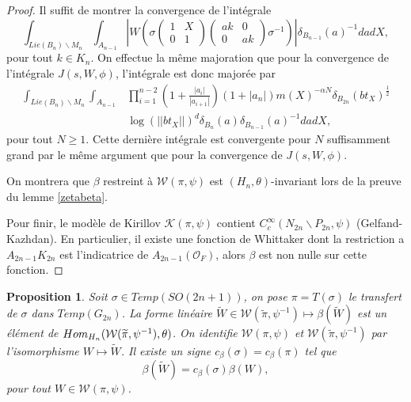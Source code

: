 \documentclass{amsart}
\newtheorem{proposition}{Proposition}[section]
\DeclareMathOperator{\Hom}{\mathnormal{Hom}}
\begin{document}
\begin{proof}
Il suffit de montrer la convergence de l'intégrale
\begin{equation}
\int_{Lie(B_n) \backslash M_n} \int_{A_{n-1}} \left|W\left(\sigma \begin{pmatrix}
1 & X \\
0 & 1
\end{pmatrix} \begin{pmatrix}
ak & 0 \\
0 & ak
\end{pmatrix}\sigma^{-1}\right)\right| \delta_{B_{n-1}}(a)^{-1} da dX,
\end{equation}
pour tout $k \in K_n$. On effectue la même majoration que pour la convergence de l'intégrale $J(s,W,\phi)$, l'intégrale est donc majorée par
\begin{equation}
\begin{split}
\int_{Lie(B_n) \backslash M_n} \int_{A_{n-1}} &\prod_{i=1}^{n-2}(1+\frac{|a_i|}{|a_{i+1}|}) (1+|a_n|) m(X)^{-\alpha N} \delta_{B_{2n}}(bt_X)^{\frac{1}{2}} \\
&\log(||bt_X||)^d \delta_{B_n}(a) \delta_{B_{n-1}}(a)^{-1} da dX,
\end{split}
\end{equation}
pour tout $N \geq 1$. Cette dernière intégrale est convergente pour $N$ suffisamment grand par le même argument que pour la convergence de $J(s,W,\phi)$.

On montrera que $\beta$ restreint à $\mathcal{W}(\pi, \psi)$ est $(H_n, \theta)$-invariant lors de la preuve du lemme \ref{zetabeta}.

Pour finir, le modèle de Kirillov $\mathcal{K}(\pi, \psi)$ contient $C^\infty_c(N_{2n} \backslash P_{2n}, \psi)$ (Gelfand-Kazhdan). En particulier, il existe une fonction de Whittaker dont la restriction a $A_{2n-1}K_{2n}$ est l'indicatrice de $A_{2n-1}(\mathcal{O}_F)$, alors $\beta$ est non nulle sur cette fonction.
\end{proof}

\begin{proposition}
\label{constbeta}
Soit $\sigma \in Temp(SO(2n+1))$, on pose $\pi = T(\sigma)$ le transfert de $\sigma$ dans $Temp(G_{2n})$. La forme linéaire $\widetilde{W} \in \mathcal{W}(\widetilde{\pi}, \psi^{-1}) \mapsto \beta(\widetilde{W})$ est un élément de $\Hom_{H_n}(\mathcal{W}(\widetilde{\pi}, \psi^{-1}), \theta)$. On identifie $\mathcal{W}(\pi, \psi)$ et $\mathcal{W}(\widetilde{\pi}, \psi^{-1})$ par l'isomorphisme $W \mapsto \widetilde{W}$. Il existe un signe $c_\beta(\sigma) = c_\beta(\pi)$ tel que
\begin{equation}
\beta(\widetilde{W}) = c_\beta(\sigma)\beta(W),
\end{equation}
pour tout $W \in \mathcal{W}(\pi, \psi)$.
\end{proposition}
\end{document}
